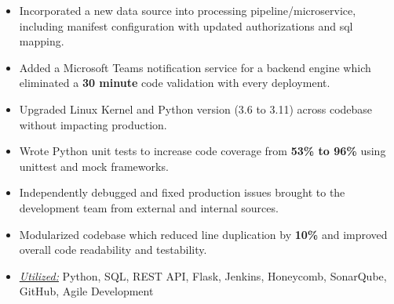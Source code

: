 \documentclass[10pt,a4paper,ragged2e]{altacv}
\begin{document}
\tagline{}

\begin{fullwidth}
\makecvheader
\end{fullwidth}




\begin{itemize}
\item Incorporated a new data source into processing pipeline/microservice, including manifest configuration with updated authorizations and sql mapping.
\item Added a Microsoft Teams notification service for a backend engine which eliminated a \textbf{30 minute} code validation with every deployment.
\item Upgraded Linux Kernel and Python version (3.6 to 3.11) across codebase without impacting production.
\item Wrote Python unit tests to increase code coverage from \textbf{53\% to 96\%} using unittest and mock frameworks.
\item Independently debugged and fixed production issues brought to the development team from external and internal sources.
\item Modularized codebase which reduced line duplication by \textbf{10\%} and improved overall code readability and testability.
\item \underline{\textit{Utilized:}} Python, SQL, REST API, Flask, Jenkins, Honeycomb, SonarQube, GitHub, Agile Development
\end{itemize}
\divider
\end{document}
